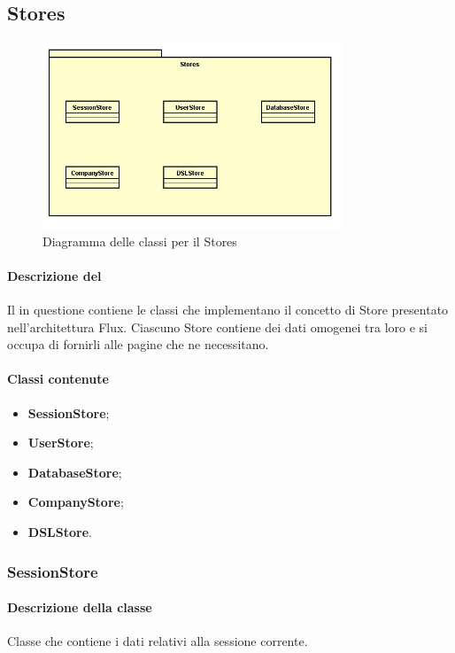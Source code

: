 \subsection{Stores}

\begin{figure}[h]
\centering
\includegraphics[width=0.8\textwidth]{res/sections/imgs/stores-diagram.jpg}
\caption{Diagramma delle classi per il  Stores}
\end{figure}

\paragraph*{Descrizione del }
Il  in questione contiene le classi che implementano il concetto di Store presentato nell'architettura Flux. Ciascuno Store contiene dei dati omogenei tra loro e si occupa di fornirli alle pagine che ne necessitano.
\paragraph*{Classi contenute}
\begin{itemize}
\item \textbf{SessionStore};
\item \textbf{UserStore};
\item \textbf{DatabaseStore};
\item \textbf{CompanyStore};
\item \textbf{DSLStore}.
\end{itemize}

\subsubsection{SessionStore}
\paragraph*{Descrizione della classe}
Classe che contiene i dati relativi alla sessione corrente.
